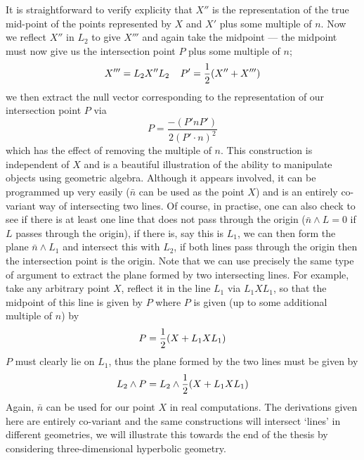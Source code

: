 %
It is straightforward to verify explicity that $X''$ is the
representation of the true mid-point of the points represented
by $X$ and $X'$ plus some multiple of $n$.
Now we reflect $X''$ in $L_2$ to give $X'''$ and again
take the midpoint --- the midpoint must now give us the
intersection point $P$ plus some multiple of $n$;
%
\[ X''' = L_2X''L_2 \;\;\;\;  P' = \frac{1}{2} (X''+X''')   \]
%
we then extract the null vector corresponding to the representation of our
intersection point $P$ via
%
\[ P = \frac{-(P'nP')}{2(P'\cdot n)^2}   \]
%
which has the effect of removing the multiple of $n$.
This construction is independent of $X$ and is a
beautiful illustration of the ability to manipulate
objects using geometric algebra. Although it appears
involved, it can be programmed up very easily ($\bar{n}$
can be used as the point $X$) and is an entirely
co-variant way of intersecting two lines. Of course, in
practise, one can also check to see if there is at least
one line that does not pass through the origin
($\bar{n}\wedge L=0$ if $L$ passes through the origin), if
there is, say this is $L_1$, we can then form the plane
$\bar{n}\wedge L_1$ and intersect this with $L_2$, if both
lines pass through the origin then the intersection point
is the origin. Note that we can use precisely the same
type of argument to extract the plane formed by two
intersecting lines. For example, take any arbitrary point
$X$, reflect it in the line $L_1$ via $L_1 X L_1$, so
that the midpoint of this line is given by $P$ where $P$
is given (up to some additional multiple of $n$) by
%
\[  P = \frac{1}{2} (X + L_1 X L_1)   \]
%
$P$ must clearly lie on $L_1$, thus the plane formed by
the two lines must be given by
%
\begin{equation}
 L_2\wedge P = L_2 \wedge \frac{1}{2}(X + L_1X L_1)
\end{equation}
%
Again, $\bar{n}$ can be used for our point $X$ in real
computations. The derivations given here are entirely
co-variant and the same constructions will intersect `lines' in different
geometries, we will illustrate this towards the end of the thesis by
considering three-dimensional hyperbolic geometry.


